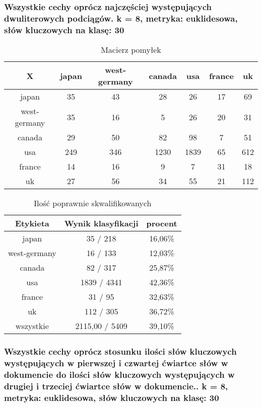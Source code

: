 \documentclass{classrep}
\begin{document}
\subsubsection{Wszystkie cechy oprócz najczęściej występujących dwuliterowych podciągów. k = 8, metryka: euklidesowa, słów kluczowych na klasę: 30}
\begin{table}[h]
\centering
\begin{tabular}{|c|c|c|c|c|c|c|}
\hline
 X  & japan & west-germany & canada & usa & france & uk\\
\hline
japan & 35 & 43 & 28 & 26 & 17 & 69\\
\hline
west-germany & 35 & 16 & 5 & 26 & 20 & 31\\
\hline
canada & 29 & 50 & 82 & 98 & 7 & 51\\
\hline
usa & 249 & 346 & 1230 & 1839 & 65 & 612\\
\hline
france & 14 & 16 & 9 & 7 & 31 & 18\\
\hline
uk & 27 & 56 & 34 & 55 & 21 & 112\\
\hline
\end{tabular}
\caption{Macierz pomyłek}\end{table}

\begin{table}[h]
\centering
\begin{tabular}{|c|c|c|}
\hline
Etykieta & Wynik klasyfikacji & procent\\
\hline
japan & 35 / 218 & 16,06\%\\
\hline
west-germany & 16 / 133 & 12,03\%\\
\hline
canada & 82 / 317 & 25,87\%\\
\hline
usa & 1839 / 4341 & 42,36\%\\
\hline
france & 31 / 95 & 32,63\%\\
\hline
uk & 112 / 305 & 36,72\%\\
\hline
wszystkie & 2115,00 / 5409 & 39,10\%\\
\hline
\end{tabular}
\caption{Ilość poprawnie skwalifikowanych}\end{table}

\newpage
\subsubsection{Wszystkie cechy oprócz stosunku ilości słów kluczowych występujących w pierwszej i czwartej ćwiartce słów w dokumencie do ilości słów kluczowych występujących w drugiej i trzeciej ćwiartce słów w dokumencie.. k = 8, metryka: euklidesowa, słów kluczowych na klasę: 30}
\end{document}
